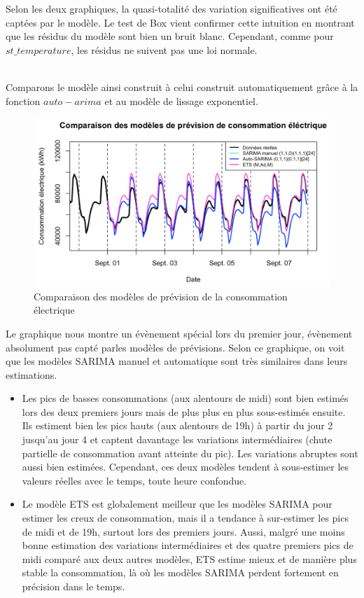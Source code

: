 \documentclass{article}
\theoremstyle{definition}
\theoremstyle{remark}
\begin{document}
\begin{minipage}{.5\textwidth}
    Selon les deux graphiques, la quasi-totalité des variation significatives ont été captées par le modèle. Le test de Box vient confirmer cette intuition en montrant que les résidus du modèle sont bien un bruit blanc. Cependant, comme pour $st\_temperature$, les résidus ne suivent pas une loi normale.\newline \\
\end{minipage}
\newline
\\
Comparons le modèle ainsi construit à celui construit automatiquement grâce à la fonction $auto-arima$ et au modèle de lissage exponentiel.
\FloatBarrier
\begin{figure}[!h]
    \centering
    \includegraphics[width=0.75\linewidth]{fig+.png}
    \caption{Comparaison des modèles de prévision de la consommation électrique}
    \label{fig:enter-label}
\end{figure}
Le graphique nous montre un évènement spécial lors du premier jour, évènement absolument pas capté parles modèles de prévisions. Selon ce graphique, on voit que les modèles SARIMA manuel et automatique sont très similaires dans
leurs estimations. 
\begin{itemize}
    \item Les pics de basses consommations (aux alentours de midi) sont bien estimés lors des deux premiers jours mais de plus plus en plus sous-estimés ensuite. Ils estiment bien les pics hauts (aux alentours de 19h) à partir du jour 2 jusqu'au jour 4 et captent davantage les variations intermédiaires (chute partielle de consommation avant atteinte du pic).\newline
Les variations abruptes sont aussi bien estimées. Cependant, ces deux modèles tendent à sous-estimer les valeurs réelles avec le temps, toute heure confondue.
    \item Le modèle ETS est globalement meilleur que les modèles SARIMA pour estimer les creux de consommation, mais il a tendance à sur-estimer les pics de midi et de 19h, surtout lors des premiers jours. Aussi, malgré une moins bonne estimation des variations intermédiaires et des quatre premiers pics de midi comparé aux deux autres modèles, ETS estime mieux et de manière plus stable la consommation, là où les
modèles SARIMA perdent fortement en précision dans le temps.
\end{itemize}
\end{document}
